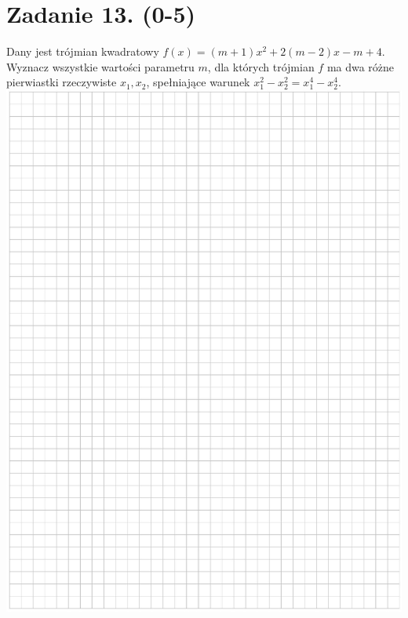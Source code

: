 \documentclass[10pt]{article}
\begin{document}
\section*{Zadanie 13. (0-5)}
Dany jest trójmian kwadratowy \(f(x)=(m+1) x^{2}+2(m-2) x-m+4\). Wyznacz wszystkie wartości parametru \(m\), dla których trójmian \(f\) ma dwa różne pierwiastki rzeczywiste \(x_{1}, x_{2}\), spełniające warunek \(x_{1}^{2}-x_{2}^{2}=x_{1}^{4}-x_{2}^{4}\).\\
\includegraphics[max width=\textwidth, center]{2024_11_21_838c0cfd77f195c20440g-14}\\
\end{document}

